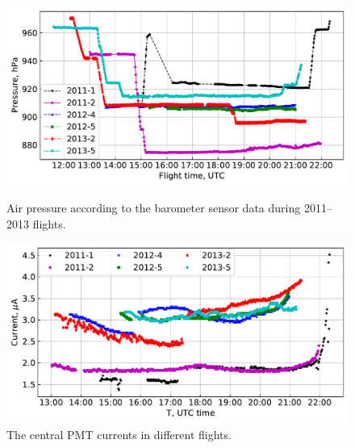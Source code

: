 \documentclass[universe,article,submit,moreauthors,pdftex]{Definitions/mdpi}
\begin{document}
\begin{paracol}{2}
\begin{figure}[tb]    
    \begin{minipage}[t]{0.48\textwidth}
        \centering
        \includegraphics[width=\textwidth]{Telemetry_pressure.pdf}
        \caption{Air pressure according to the barometer sensor data during 2011--2013 flights.}
        \label{fig:pressure}
    \end{minipage}
    \hfill
    \begin{minipage}[t]{0.48\textwidth}
        \centering
        \includegraphics[width=\textwidth]{hv-53.pdf}
        \caption{The central PMT currents in different flights.}
        \label{fig:current}
    \end{minipage}
\end{figure}



\end{paracol}
\end{document}
